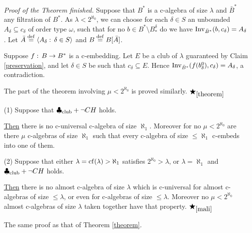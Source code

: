 \begin{Proof}
{\em Proof of the Theorem finished.}
Suppose that $B^\ast$ is a c-algebra of size $\lambda$
and $\bar{B}^\ast$ any filtration of $B^\ast$. As $\lambda<2^{\aleph_0}$,
we can choose for each $\delta\in S$ an unbounded $A_\delta\subseteq c_\delta$
of order type $\omega$,
such that for
no $b\in B^\ast\setminus B_\ast^\delta$
do we have
${\rm Inv}_{\bar{B}^\ast}
(b,c_\delta)=A_\delta$.
Let $\bar{A}\deq\langle A_\delta:\,\delta\in S\rangle$ and $B\deq B[\bar{A}]$.

Suppose $f:\,B\rightarrow B^\ast$ is a c-embedding. Let $E$ be
a club of $\lambda$ guaranteed by Claim \ref{preservation}, and
let $\delta\in S$ be such that $c_\delta\subseteq E$. Hence
${\rm Inv}_{\bar{B}^\ast}
(f(b^0_\delta),c_\delta)=A_\delta$, a contradiction.

The part of the theorem involving $\mu<2^{\aleph_0}$ is proved similarly.
$\bigstar_{\ref{theorem}}$
\end{Proof}

\begin{Theorem}\label{mali} (1) Suppose that $\clubsuit_{\rm club}+\neg CH$
holds.

\underline{Then} there is no c-universal c-algebra of size $\aleph_1$.
Moreover for no $\mu<2^{\aleph_0}$ are there $\mu$ c-algebras
of size $\aleph_1$ such that every c-algebra of size
$\le\aleph_1$ c-embeds into one of them.

{\noindent (2)} Suppose that either $\lambda={\rm cf}(\lambda)>\aleph_1$
satisfies $2^{\aleph_0}>\lambda$, or $\lambda=\aleph_1$ and
$\clubsuit_{\rm club}+\neg CH$
holds.

\underline{Then} there is no almost c-algebra of size $\lambda$
which is c-universal for almost c-algebras of size $\le \lambda$, or even for
c-algebras of size $\le \lambda$.
Moreover no $\mu<2^{\aleph_0}$ almost c-algebras
of size $\lambda$ taken together have that property.
$\bigstar_{\ref{mali}}$
\end{Theorem}

\begin{Proof} The same proof as that of Theorem \ref{theorem}.
\end{Proof}
%
%
\eject

